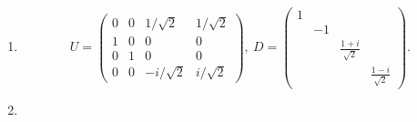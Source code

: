 \documentclass[a4paper,pdflatex,ja=standard]{bxjsarticle}
\begin{document}
\begin{enumerate}
\begin{enumerate}
    \item 

    \begin{equation}
      U
      =
      \begin{pmatrix}
        0 & 0 & 1/\sqrt{2} & 1/\sqrt{2} \\
        1 & 0 & 0 & 0 \\
        0 & 1 & 0 & 0 \\
        0 & 0 & -i/\sqrt{2} & i/\sqrt{2}
      \end{pmatrix}
      ,\ 
      D
      =
      \begin{pmatrix}
        1 & & & \\
          & -1 & & \\
          & & \frac{1+i}{\sqrt{2}} & \\
          & & & \frac{1-i}{\sqrt{2}}
      \end{pmatrix}
      .
    \end{equation}


    \item 


\end{enumerate}
\end{enumerate}
\end{document}
